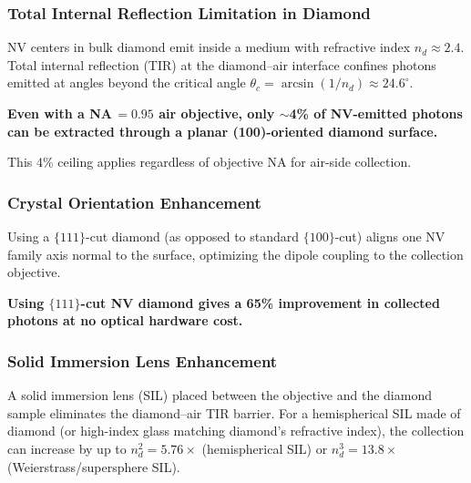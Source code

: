 \subsubsection{Total Internal Reflection Limitation in Diamond}

NV centers in bulk diamond emit inside a medium with refractive index
$n_d \approx 2.4$. Total internal reflection (TIR) at the diamond--air
interface confines photons emitted at angles beyond the critical angle
$\theta_c = \arcsin(1/n_d) \approx 24.6^\circ$.

\textbf{Even with a NA\,$= 0.95$ air objective, only $\sim$4\% of NV-emitted
photons can be extracted through a planar (100)-oriented diamond
surface.}\cite{Hopper2018}

This 4\% ceiling applies regardless of objective NA for air-side collection.

\subsubsection{Crystal Orientation Enhancement}

Using a $\{111\}$-cut diamond (as opposed to standard $\{100\}$-cut) aligns
one NV family axis normal to the surface, optimizing the dipole coupling to
the collection objective.\cite{Hopper2018}

\textbf{Using $\{111\}$-cut NV diamond gives a 65\% improvement in collected
photons at no optical hardware cost.}\cite{Hopper2018}


\subsubsection{Solid Immersion Lens Enhancement}

A solid immersion lens (SIL) placed between the objective and the diamond
sample eliminates the diamond--air TIR barrier. For a hemispherical SIL
made of diamond (or high-index glass matching diamond's refractive index),
the collection can increase by up to $n_d^2 = 5.76\times$ (hemispherical
SIL) or $n_d^3 = 13.8\times$ (Weierstrass/supersphere SIL).\cite{Hadden2010SIL}

